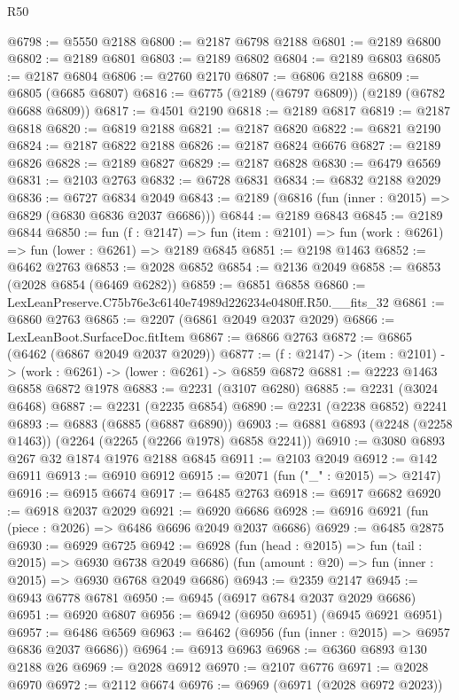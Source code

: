 \begin{lexlean}{R50}
\begin{coremodule}
@6798 := @5550 @2188
@6800 := @2187 @6798 @2188
@6801 := @2189 @6800
@6802 := @2189 @6801
@6803 := @2189 @6802
@6804 := @2189 @6803
@6805 := @2187 @6804
@6806 := @2760 @2170
@6807 := @6806 @2188
@6809 := @6805 (@6685 @6807)
@6816 := @6775 (@2189 (@6797 @6809)) (@2189 (@6782 @6688 @6809))
@6817 := @4501 @2190
@6818 := @2189 @6817
@6819 := @2187 @6818
@6820 := @6819 @2188
@6821 := @2187 @6820
@6822 := @6821 @2190
@6824 := @2187 @6822 @2188
@6826 := @2187 @6824 @6676
@6827 := @2189 @6826
@6828 := @2189 @6827
@6829 := @2187 @6828
@6830 := @6479 @6569
@6831 := @2103 @2763
@6832 := @6728 @6831
@6834 := @6832 @2188 @2029
@6836 := @6727 @6834 @2049
@6843 := @2189 (@6816 (fun (inner : @2015) => @6829 (@6830 @6836 @2037 @6686)))
@6844 := @2189 @6843
@6845 := @2189 @6844
@6850 := fun (f : @2147) =>
  fun (item : @2101) => fun (work : @6261) => fun (lower : @6261) => @2189 @6845
@6851 := @2198 @1463
@6852 := @6462 @2763
@6853 := @2028 @6852
@6854 := @2136 @2049
@6858 := @6853 (@2028 @6854 (@6469 @6282))
@6859 := @6851 @6858
@6860 := LexLeanPreserve.C75b76e3c6140e74989d226234e0480ff.R50.__fits_32
@6861 := @6860 @2763
@6865 := @2207 (@6861 @2049 @2037 @2029)
@6866 := LexLeanBoot.SurfaceDoc.fitItem
@6867 := @6866 @2763
@6872 := @6865 (@6462 (@6867 @2049 @2037 @2029))
@6877 := (f : @2147) -> (item : @2101) -> (work : @6261) -> (lower : @6261) -> @6859 @6872
@6881 := @2223 @1463 @6858 @6872 @1978
@6883 := @2231 (@3107 @6280)
@6885 := @2231 (@3024 @6468)
@6887 := @2231 (@2235 @6854)
@6890 := @2231 (@2238 @6852) @2241
@6893 := @6883 (@6885 (@6887 @6890))
@6903 := @6881 @6893 (@2248 (@2258 @1463)) (@2264 (@2265 (@2266 @1978) @6858 @2241))
@6910 := @3080 @6893 @267 @32 @1874 @1976 @2188 @6845
@6911 := @2103 @2049
@6912 := @142 @6911
@6913 := @6910 @6912
@6915 := @2071 (fun ("_" : @2015) => @2147)
@6916 := @6915 @6674
@6917 := @6485 @2763
@6918 := @6917 @6682
@6920 := @6918 @2037 @2029
@6921 := @6920 @6686
@6928 := @6916 @6921 (fun (piece : @2026) => @6486 @6696 @2049 @2037 @6686)
@6929 := @6485 @2875
@6930 := @6929 @6725
@6942 := @6928
    (fun (head : @2015) => fun (tail : @2015) => @6930 @6738 @2049 @6686)
    (fun (amount : @20) => fun (inner : @2015) => @6930 @6768 @2049 @6686)
@6943 := @2359 @2147
@6945 := @6943 @6778 @6781
@6950 := @6945 (@6917 @6784 @2037 @2029 @6686)
@6951 := @6920 @6807
@6956 := @6942 (@6950 @6951) (@6945 @6921 @6951)
@6957 := @6486 @6569
@6963 := @6462 (@6956 (fun (inner : @2015) => @6957 @6836 @2037 @6686))
@6964 := @6913 @6963
@6968 := @6360 @6893 @130 @2188 @26
@6969 := @2028 @6912
@6970 := @2107 @6776
@6971 := @2028 @6970
@6972 := @2112 @6674
@6976 := @6969 (@6971 (@2028 @6972 @2023))

\end{coremodule}
\end{lexlean}
